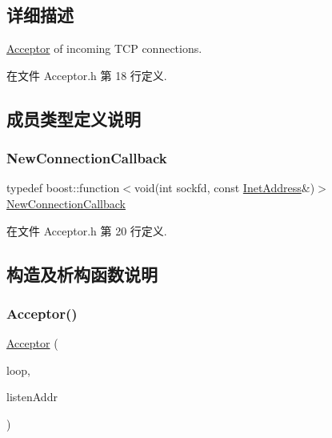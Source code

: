 \subsection{详细描述}
\hyperlink{classmuduo_1_1Acceptor}{Acceptor} of incoming T\+CP connections. 

在文件 Acceptor.\+h 第 18 行定义.



\subsection{成员类型定义说明}
\mbox{\label{classmuduo_1_1Acceptor_ad9da8988c47fddac6b0b91e01e154814}} 
\subsubsection{\texorpdfstring{New\+Connection\+Callback}{NewConnectionCallback}}
{\footnotesize\ttfamily typedef boost\+::function$<$void(int sockfd, const \hyperlink{classmuduo_1_1InetAddress}{Inet\+Address}\&)$>$ \hyperlink{classmuduo_1_1Acceptor_ad9da8988c47fddac6b0b91e01e154814}{New\+Connection\+Callback}}



在文件 Acceptor.\+h 第 20 行定义.



\subsection{构造及析构函数说明}
\mbox{\label{classmuduo_1_1Acceptor_a034c2e4c8c39c67bcaa4a47a6fa906fd}} 
\subsubsection{\texorpdfstring{Acceptor()}{Acceptor()}}
{\footnotesize\ttfamily \hyperlink{classmuduo_1_1Acceptor}{Acceptor} (\begin{DoxyParamCaption}\item[{\hyperlink{classmuduo_1_1EventLoop}{Event\+Loop} $\ast$}]{loop,  }\item[{const \hyperlink{classmuduo_1_1InetAddress}{Inet\+Address} \&}]{listen\+Addr }\end{DoxyParamCaption})}



